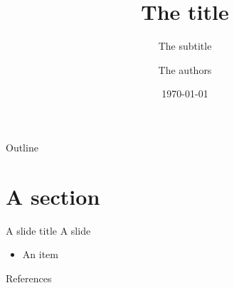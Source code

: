 \documentclass[
11pt,
aspectratio=43,
]{beamer}
\title{The title}
\subtitle{The subtitle}
\author{The authors}
\institute{The institute}
\date{\today}
\begin{document}
\begin{frame}
\maketitle
\end{frame}

\begin{frame}{Outline}
\tableofcontents
\end{frame}

\section{A section}

\begin{frame}{A slide title}
  A slide
  \begin{itemize}
    \item An item
  \end{itemize}
\end{frame}

\begin{frame}[allowframebreaks]{References}
  \nocite{*}
  
  
\end{frame}
\end{document}
